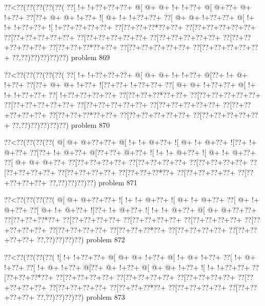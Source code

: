 \vbox{\vbox{\goo
\0??<\0??(\0??(\0??(\0??(\0??(
\0??[\- !+\- !+\0??+\0??+\0??+
\- @[\- @+\- @+\- !+\- !+\0??+
\- @[\- @+\0??+\- @+\- !+\0??+
\0??[\0??+\- @+\- @+\- !+\0??+
\- ![\- @+\- !+\- !+\0??+\0??+
\0??[\- @+\- @+\- !+\0??+\0??+
\- @[\- !+\- !+\- !+\0??+\0??+
\- ![\- !+\0??+\0??+\0??+\0??+
\0??[\0??+\0??+\0??*\0??+\0??+
\0??[\0??+\0??+\0??+\0??+\0??+
\0??[\0??+\0??+\0??+\0??+\0??+
\0??[\0??+\0??+\0??+\0??+\0??+
\0??[\0??+\0??+\0??+\0??+\0??+
\0??[\0??+\0??+\0??+\0??+\0??+
\0??[\0??+\0??+\0??*\0??+\0??+
\0??[\0??+\0??+\0??+\0??+\0??+
\0??[\0??+\0??+\0??+\0??+\0??+
\0??,\0??)\0??)\0??)\0??)\0??)
}
\hfil problem 869\hfil\break
}

\vbox{\vbox{\goo
\0??<\0??(\0??(\0??(\0??(\0??(
\0??[\- !+\- !+\0??+\0??+\0??+
\- @[\- @+\- @+\- !+\- !+\0??+
\- @[\0??+\- !+\- @+\- !+\0??+
\0??[\0??+\- @+\- @+\- !+\0??+
\- ![\0??+\0??+\- !+\0??+\0??+
\0??[\- @+\- @+\- !+\0??+\0??+
\- @[\- !+\- !+\- !+\0??+\0??+
\0??[\- !+\0??+\0??+\0??+\0??+
\0??[\0??+\0??+\0??*\0??+\0??+
\0??[\0??+\0??+\0??+\0??+\0??+
\0??[\0??+\0??+\0??+\0??+\0??+
\0??[\0??+\0??+\0??+\0??+\0??+
\0??[\0??+\0??+\0??+\0??+\0??+
\0??[\0??+\0??+\0??+\0??+\0??+
\0??[\0??+\0??+\0??*\0??+\0??+
\0??[\0??+\0??+\0??+\0??+\0??+
\0??[\0??+\0??+\0??+\0??+\0??+
\0??,\0??)\0??)\0??)\0??)\0??)
}
\hfil problem 870\hfil\break
}

\vbox{\vbox{\goo
\0??<\0??(\0??(\0??(\0??(
\- @[\- @+\- @+\0??+\0??+
\- @[\- !+\- !+\- @+\0??+
\- ![\- @+\- !+\- @+\0??+
\- ![\0??+\- !+\- @+\0??+
\0??[\0??+\- !+\- @+\0??+
\- @[\0??+\0??+\- @+\0??+
\- ![\- !+\- !+\- @+\0??+
\- ![\- @+\- !+\- @+\0??+
\0??[\- @+\- @+\- @+\0??+
\0??[\0??+\0??+\0??+\0??+
\0??[\0??+\0??+\0??+\0??+
\0??[\0??+\0??+\0??+\0??+
\0??[\0??+\0??+\0??+\0??+
\0??[\0??+\0??+\0??+\0??+
\0??[\0??+\0??+\0??*\0??+
\0??[\0??+\0??+\0??+\0??+
\0??[\0??+\0??+\0??+\0??+
\0??,\0??)\0??)\0??)\0??)
}
\hfil problem 871\hfil\break
}

\vbox{\vbox{\goo
\0??<\0??(\0??(\0??(\0??(
\- @[\- @+\- @+\0??+\0??+
\- ![\- !+\- !+\- @+\0??+
\- ![\- @+\- !+\- @+\0??+
\0??[\- @+\- !+\- @+\0??+
\0??[\- @+\- !+\- @+\0??+
\- ![\0??+\- !+\- @+\0??+
\- ![\- !+\- !+\- @+\0??+
\- @[\- @+\- @+\0??+\0??+
\0??[\0??+\0??+\0??*\0??+
\0??[\0??+\0??+\0??+\0??+
\0??[\0??+\0??+\0??+\0??+
\0??[\0??+\0??+\0??+\0??+
\0??[\0??+\0??+\0??+\0??+
\0??[\0??+\0??+\0??+\0??+
\0??[\0??+\0??+\0??*\0??+
\0??[\0??+\0??+\0??+\0??+
\0??[\0??+\0??+\0??+\0??+
\0??,\0??)\0??)\0??)\0??)
}
\hfil problem 872\hfil\break
}

\vbox{\vbox{\goo
\0??<\0??(\0??(\0??(\0??(
\- ![\- !+\- !+\0??+\0??+
\- @[\- @+\- @+\- !+\0??+
\- @[\- !+\- @+\- !+\0??+
\0??[\- !+\- @+\- !+\0??+
\0??[\- !+\- @+\- !+\0??+
\- @[\0??+\- @+\- !+\0??+
\- @[\- @+\- @+\- !+\0??+
\- ![\- !+\- !+\0??+\0??+
\0??[\0??+\0??+\0??*\0??+
\0??[\0??+\0??+\0??+\0??+
\0??[\0??+\0??+\0??+\0??+
\0??[\0??+\0??+\0??+\0??+
\0??[\0??+\0??+\0??+\0??+
\0??[\0??+\0??+\0??+\0??+
\0??[\0??+\0??+\0??*\0??+
\0??[\0??+\0??+\0??+\0??+
\0??[\0??+\0??+\0??+\0??+
\0??,\0??)\0??)\0??)\0??)
}
\hfil problem 873\hfil\break
}

